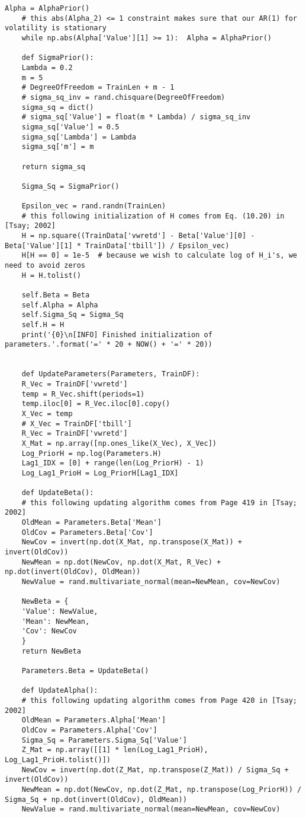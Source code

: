 \documentclass[letterpaper]{article}
\begin{document}
\begin{lstlisting}[label=lst:pythoncode]
	Alpha = AlphaPrior()
	# this abs(Alpha_2) <= 1 constraint makes sure that our AR(1) for volatility is stationary
	while np.abs(Alpha['Value'][1] >= 1):  Alpha = AlphaPrior()
	
	def SigmaPrior():
	Lambda = 0.2
	m = 5
	# DegreeOfFreedom = TrainLen + m - 1
	# sigma_sq_inv = rand.chisquare(DegreeOfFreedom)
	sigma_sq = dict()
	# sigma_sq['Value'] = float(m * Lambda) / sigma_sq_inv
	sigma_sq['Value'] = 0.5
	sigma_sq['Lambda'] = Lambda
	sigma_sq['m'] = m
	
	return sigma_sq
	
	Sigma_Sq = SigmaPrior()
	
	Epsilon_vec = rand.randn(TrainLen)
	# this following initialization of H comes from Eq. (10.20) in [Tsay; 2002]
	H = np.square((TrainData['vwretd'] - Beta['Value'][0] - Beta['Value'][1] * TrainData['tbill']) / Epsilon_vec)
	H[H == 0] = 1e-5  # because we wish to calculate log of H_i's, we need to avoid zeros
	H = H.tolist()
	
	self.Beta = Beta
	self.Alpha = Alpha
	self.Sigma_Sq = Sigma_Sq
	self.H = H
	print('{0}\n[INFO] Finished initialization of parameters.'.format('=' * 20 + NOW() + '=' * 20))
	
	
	def UpdateParameters(Parameters, TrainDF):
	R_Vec = TrainDF['vwretd']
	temp = R_Vec.shift(periods=1)
	temp.iloc[0] = R_Vec.iloc[0].copy()
	X_Vec = temp
	# X_Vec = TrainDF['tbill']
	R_Vec = TrainDF['vwretd']
	X_Mat = np.array([np.ones_like(X_Vec), X_Vec])
	Log_PriorH = np.log(Parameters.H)
	Lag1_IDX = [0] + range(len(Log_PriorH) - 1)
	Log_Lag1_PrioH = Log_PriorH[Lag1_IDX]
	
	def UpdateBeta():
	# this following updating algorithm comes from Page 419 in [Tsay; 2002]
	OldMean = Parameters.Beta['Mean']
	OldCov = Parameters.Beta['Cov']
	NewCov = invert(np.dot(X_Mat, np.transpose(X_Mat)) + invert(OldCov))
	NewMean = np.dot(NewCov, np.dot(X_Mat, R_Vec) + np.dot(invert(OldCov), OldMean))
	NewValue = rand.multivariate_normal(mean=NewMean, cov=NewCov)
	
	NewBeta = {
	'Value': NewValue,
	'Mean': NewMean,
	'Cov': NewCov
	}
	return NewBeta
	
	Parameters.Beta = UpdateBeta()
	
	def UpdateAlpha():
	# this following updating algorithm comes from Page 420 in [Tsay; 2002]
	OldMean = Parameters.Alpha['Mean']
	OldCov = Parameters.Alpha['Cov']
	Sigma_Sq = Parameters.Sigma_Sq['Value']
	Z_Mat = np.array([[1] * len(Log_Lag1_PrioH), Log_Lag1_PrioH.tolist()])
	NewCov = invert(np.dot(Z_Mat, np.transpose(Z_Mat)) / Sigma_Sq + invert(OldCov))
	NewMean = np.dot(NewCov, np.dot(Z_Mat, np.transpose(Log_PriorH)) / Sigma_Sq + np.dot(invert(OldCov), OldMean))
	NewValue = rand.multivariate_normal(mean=NewMean, cov=NewCov)
	

\end{lstlisting}
\end{document}
